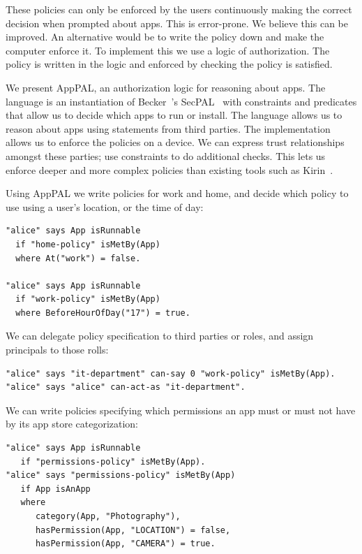 \documentclass[]{llncs}
\begin{document}
These policies can only be enforced by the users continuously making the correct decision when prompted about apps.
This is error-prone.
We believe this can be improved.
An alternative would be to write the policy down and make the computer enforce it.
To implement this we use a logic of authorization.
The policy is written in the logic and enforced by checking the policy is satisfied.

We present AppPAL, an authorization logic for reasoning about apps.
The language is an instantiation of Becker~\etal's SecPAL~\cite{Becker:2006vh} with constraints and predicates that allow us to decide which apps to run or install.
The language allows us to reason about apps using statements from third parties.
The implementation allows us to enforce the policies on a device.
We can express trust relationships amongst these parties; use constraints to do additional checks.
This lets us enforce deeper and more complex policies than existing tools such as Kirin~\cite{Enck:2009ko}.

Using AppPAL we write policies for work and home, and decide which policy to use using a user's location, or the time of day:
\begin{lstlisting}
"alice" says App isRunnable
  if "home-policy" isMetBy(App)
  where At("work") = false.

"alice" says App isRunnable
  if "work-policy" isMetBy(App)
  where BeforeHourOfDay("17") = true.
\end{lstlisting}
We can delegate policy specification to third parties or roles, and assign principals to those rolls:
\begin{lstlisting}
"alice" says "it-department" can-say 0 "work-policy" isMetBy(App).
"alice" says "alice" can-act-as "it-department".
\end{lstlisting}
We can write policies specifying which permissions an app must or must not have by its app store categorization:
    \begin{lstlisting}
"alice" says App isRunnable
   if "permissions-policy" isMetBy(App).
"alice" says "permissions-policy" isMetBy(App)
   if App isAnApp
   where
      category(App, "Photography"),
      hasPermission(App, "LOCATION") = false,
      hasPermission(App, "CAMERA") = true.
    \end{lstlisting}
\end{document}
